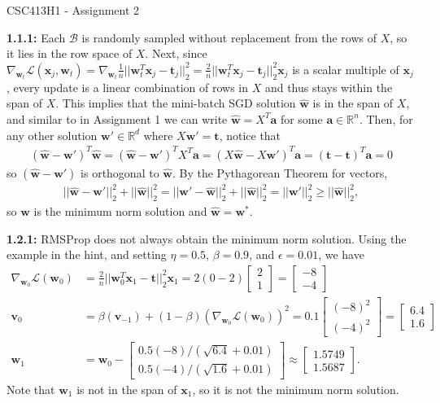 \documentclass[12pt]{article}
\newcommand{\m}[1]{\mathbf{#1}}
\newcommand{\mhat}[1]{\hat{\mathbf{#1}}}
\begin{document}
\begin{center}
{\Large CSC413H1 - Assignment 2}
\end{center}

\textbf{1.1.1:} Each $\mathcal{B}$ is randomly sampled without replacement from the rows of $X$, so it lies in the row space of $X$. Next, since $\nabla_{\m w_t} \mathcal{L}(\m x_j,\m w_t) = \nabla_{\m w_t} \frac{1}{n}||\m w_t^T \m x_j - \m t_j||^2_2 = \frac{2}{n}||\m w_t^T \m x_j - \m t_j||^2_2 \m x_j$ is a scalar multiple of $\m x_j$, every update is a linear combination of rows in $X$ and thus stays within the span of $X$. This implies that the mini-batch SGD solution $\mhat w$ is in the span of $X$, and similar to in Assignment 1 we can write $\mhat w = X^T\m a$ for some $\m a \in \mathbb{R}^n$. Then, for any other solution $\m w' \in \mathbb{R}^d$ where $X\m w' = \m t$, notice that \begin{align*}
    (\mhat w - \m w')^T\mhat w = (\mhat w - \m w')^T X^T\m a = (X\mhat w - X\m w')^T\m a = (\m t - \m t)^T\m a = 0
\end{align*} so $(\mhat w - \m w')$ is orthogonal to $\mhat w$. By the Pythagorean Theorem for vectors, \begin{align*}
    ||\mhat w - \m w'||^2_2 + ||\mhat w||^2_2 = ||\m w' - \mhat w||^2_2 + ||\mhat w||^2_2 = ||\m w'||^2_2 \geq ||\mhat w||^2_2,
\end{align*} so $\mhat w$ is the minimum norm solution and $\mhat w = \m w^*$.

\textbf{1.2.1:} RMSProp does not always obtain the minimum norm solution. Using the example in the hint, and setting $\eta = 0.5$, $\beta = 0.9$, and $\epsilon = 0.01$, we have \begin{align*}
    \nabla_{\m w_0} \mathcal{L}(\m w_0) &= \frac{2}{n}||\m w_0^T \m x_1 - \m t||^2_2 \m x_1 = 2(0-2)\begin{bmatrix} 2 \\ 1 \end{bmatrix} = \begin{bmatrix} -8 \\ -4 \end{bmatrix}\\
    \m v_0 &= \beta(\m v_{-1}) + (1-\beta)(\nabla_{\m w_0} \mathcal{L}(\m w_0))^2 = 0.1\begin{bmatrix} (-8)^2 \\ (-4)^2 \end{bmatrix} = \begin{bmatrix} 6.4 \\ 1.6 \end{bmatrix}\\
    \m w_1 &= \m w_0 - \begin{bmatrix} 0.5(-8)/(\sqrt{6.4}+0.01) \\ 0.5(-4)/(\sqrt{1.6}+0.01) \end{bmatrix} \approx \begin{bmatrix} 1.5749 \\ 1.5687 \end{bmatrix}.
\end{align*} Note that $\m w_1$ is not in the span of $\m x_1$, so it is not the minimum norm solution.
\end{document}
